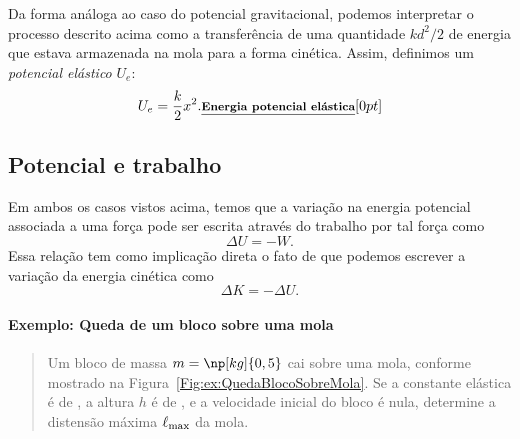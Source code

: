 Da forma análoga ao caso do potencial gravitacional, podemos interpretar o processo descrito acima como a transferência de uma quantidade $kd^2/2$ de energia que estava armazenada na mola para a forma cinética. Assim, definimos um \emph{potencial elástico} $U_e$:
\begin{equation}
  U_e = \frac{k}{2}x^2. \relax{\footnotesize\emph{\textbf{Energia potencial elástica}}}[0pt]
\end{equation}

\subsection{Potencial e trabalho}

Em ambos os casos vistos acima, temos que a variação na energia potencial associada a uma força pode ser escrita através do trabalho por tal força como
\begin{equation}
  \Delta U = - W.
\end{equation}
%
Essa relação tem como implicação direta o fato de que podemos escrever a variação da energia cinética como
\begin{equation}
    \Delta K = - \Delta U.
\end{equation}

\paragraph{Exemplo: Queda de um bloco sobre uma mola}

\begin{quote}
    Um bloco de massa $m = \np[kg]{0,5}$ cai sobre uma mola, conforme mostrado na Figura~\ref{Fig:ex:QuedaBlocoSobreMola}. Se a constante elástica é de , a altura $h$ é de , e a velocidade inicial do bloco é nula, determine a distensão máxima $\ell_{\rm{max}}$ da mola.
\end{quote}

